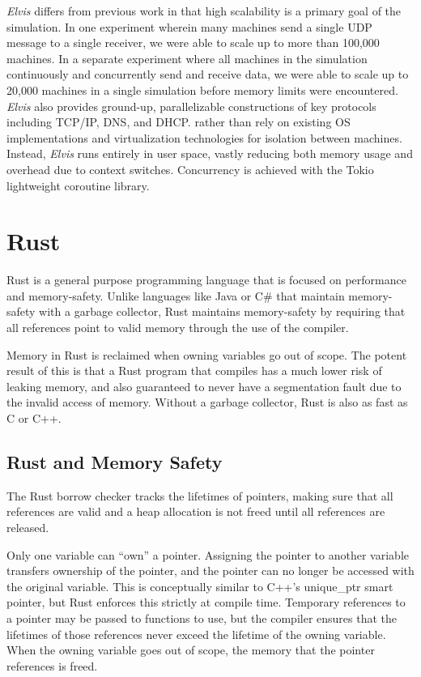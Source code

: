 \documentclass[journal]{IEEEtran} %
\newcommand{\elvis}{\textit{Elvis}}
\begin{document}
\elvis{} differs from previous work in that high scalability is a primary goal of the simulation. In one experiment wherein many machines send a single UDP message to a single receiver, we were able to scale up to more than 100,000 machines. In a separate experiment where all machines in the simulation continuously and concurrently send and receive data, we were able to scale up to 20,000 machines in a single simulation before memory limits were encountered. \elvis{} also provides ground-up, parallelizable constructions of key protocols including TCP/IP, DNS, and DHCP. rather than rely on existing OS implementations and virtualization technologies for isolation between machines. Instead, \elvis{} runs entirely in user space, vastly reducing both memory usage and overhead due to context switches. Concurrency is achieved with the Tokio\cite{tokio} lightweight coroutine library.

\section{Rust}

Rust is a general purpose programming language that is focused on performance and memory-safety. Unlike languages like Java or C\# that maintain memory-safety with a garbage collector, Rust maintains memory-safety by requiring that all references point to valid memory through the use of the compiler. 

Memory in Rust is reclaimed when owning variables go out of scope. The potent result of this is that a Rust program that compiles has a much lower risk of leaking memory,  and also guaranteed to never have a segmentation fault due to the invalid access of memory. Without a garbage collector, Rust is also as fast as C or C++\cite{rust-speed}.


\subsection{Rust and Memory Safety}

The Rust borrow checker tracks the lifetimes of pointers, making sure that all references are valid and a heap allocation is not freed until all references are released. 

Only one variable can ``own'' a pointer. Assigning the pointer to another variable transfers ownership of the pointer, and the pointer can no longer be accessed with the original variable. This is conceptually similar to C++'s unique\_ptr smart pointer, but Rust enforces this strictly at compile time. Temporary references to a pointer may be passed to functions to use, but the compiler ensures that the lifetimes of those references never exceed the lifetime of the owning variable. When the owning variable goes out of scope, the memory that the pointer references is freed.
\end{document}
